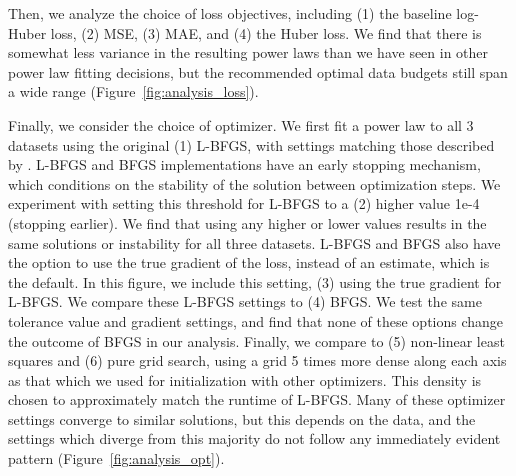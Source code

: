 Then, we analyze the choice of loss objectives, including (1) the baseline log-Huber loss, (2) MSE, (3) MAE, and (4) the Huber loss. We find that there is somewhat less variance in the resulting power laws than we have seen in other power law fitting decisions, but the recommended optimal data budgets still span a wide range (Figure~\ref{fig:analysis_loss}).

Finally, we consider the choice of optimizer. We first fit a power law to all 3 datasets using the original (1) L-BFGS, with settings matching those described by \citet{hoffmann2022training}. L-BFGS and BFGS implementations have an early stopping mechanism, which conditions on the stability of the solution between optimization steps. We experiment with setting this threshold for L-BFGS to a (2) higher value 1e-4 (stopping earlier).
We find that using any higher or lower values results in the same solutions or instability for all three datasets. L-BFGS and BFGS also have the option to use the true gradient of the loss, instead of an estimate, which is the default. In this figure, we include this setting, (3) using the true gradient for L-BFGS. We compare these L-BFGS settings to (4) BFGS. We test the same tolerance value and gradient settings, and find that none of these options change the outcome of BFGS in our analysis. Finally, we compare to (5) non-linear least squares and (6) pure grid search, using a grid 5 times more dense along each axis as that which we used for initialization with other optimizers. This density is chosen to approximately match the runtime of L-BFGS.
Many of these optimizer settings converge to similar solutions, but this depends on the data, and the settings which diverge from this majority do not follow any immediately evident pattern (Figure~\ref{fig:analysis_opt}).



